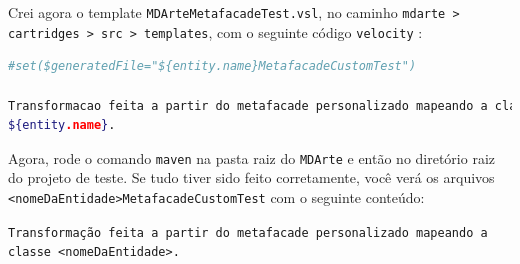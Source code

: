 Crei agora o template \texttt{MDArteMetafacadeTest.vsl}, no caminho
\texttt{mdarte > cartridges > src > templates}, com o seguinte código
\texttt{velocity} :

\begin{lstlisting}[language=bash,
frame=single]
#set($generatedFile="${entity.name}MetafacadeCustomTest")

Transformacao feita a partir do metafacade personalizado mapeando a classe
${entity.name}.
\end{lstlisting}

Agora, rode o comando \texttt{maven} na pasta raiz do \texttt{MDArte} e então no
diretório raiz do projeto de teste. Se tudo tiver sido feito corretamente, você
verá os arquivos \texttt{<nomeDaEntidade>MetafacadeCustomTest} com o seguinte
conteúdo:

\texttt{Transformação feita a partir do metafacade personalizado mapeando a
classe <nomeDaEntidade>.}